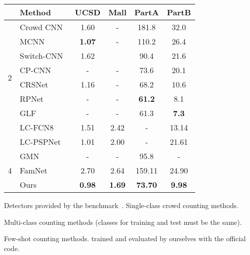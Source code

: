 \documentclass[10pt,twocolumn,letterpaper]{article}
\begin{document}
\begin{table}[t]
\begin{minipage}[t]{0.48\textwidth}
\begin{threeparttable}
\begin{tabular}{clcccc}
\toprule
 & Method & UCSD & Mall & PartA & PartB \\
\midrule
\multirow{8}{*}{2}
& Crowd CNN~\cite{crowd_cnn}   & 1.60    & -        & 181.8     & 32.0     \\
& MCNN~\cite{mcnn}             & \textbf{1.07} & -  & 110.2     & 26.4     \\
& Switch-CNN~\cite{switch_cnn} & 1.62    &          & 90.4      & 21.6     \\
& CP-CNN~\cite{cp_cnn}         & -       & -        & 73.6      & 20.1     \\
& CRSNet~\cite{crsnet}         & 1.16    & -        & 68.2      & 10.6     \\
& RPNet~\cite{rpnet}           & -       & -        & \textbf{61.2} & 8.1      \\
& GLF~\cite{glf}               & -       & -        & 61.3          & \textbf{7.3}      \\
\cmidrule{1-6}
\multirow{2}{*}{3}
& LC-FCN8~\cite{blobs}         & 1.51      & 2.42      & -           & 13.14    \\
& LC-PSPNet~\cite{blobs}       & 1.01      & 2.00      & -           & 21.61    \\
\cmidrule{1-6}
\multirow{3}{*}{4}
& GMN~\cite{gmn}               & -         & -         & 95.8        & -        \\
& FamNet~\cite{famnet}         & 2.70\tnote{\dag} & 2.64\tnote{\dag} & 159.11\tnote{\dag} & 24.90\tnote{\dag} \\
\cmidrule{2-6}
& Ours & \textbf{0.98} & \textbf{1.69} & \textbf{73.70} & \textbf{9.98}     \\
\bottomrule
\end{tabular}
\end{threeparttable}
\end{minipage}
\begin{threeparttable}
\begin{tablenotes}
\scriptsize
\item[1] Detectors provided by the benchmark~\cite{lpn}. \quad  Single-class crowd counting methods. 
\item[3] Multi-class counting methods (classes for training and test must be the same). \item[4] Few-shot counting methods. \quad  trained and evaluated by ourselves with the official code.
\end{tablenotes}
\end{threeparttable}
\vspace{-10pt}
\label{tab:res_car_crowd}
\end{table}
\fi
\end{document}
